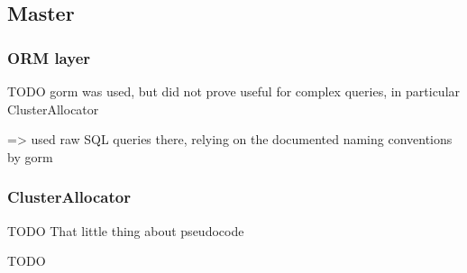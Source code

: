 \subsection{Master}

\subsubsection{ORM layer}

TODO gorm was used, but did not prove useful for complex queries, in particular ClusterAllocator

=> used  raw SQL queries there, relying on the documented naming conventions by gorm

\subsubsection{ClusterAllocator}

TODO That little thing about pseudocode


TODO


